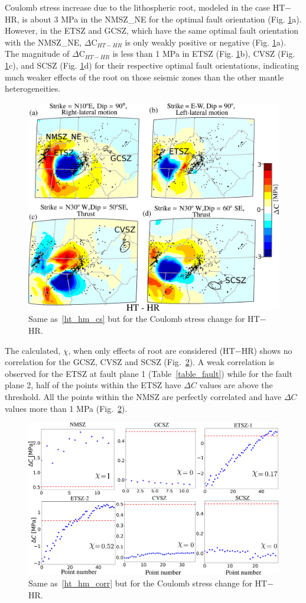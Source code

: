 \documentclass[draft,linenumbers]{agujournal2018}
\begin{document}
Coulomb stress increase due to the lithospheric root, modeled in the case HT$-$HR, is about 3 MPa in the NMSZ\_NE for the optimal fault orientation (Fig. \ref{ht_hr_cs}a). However, in the ETSZ and GCSZ, which have the same optimal fault orientation with the NMSZ\_NE, $\Delta $C$_{HT-HR}$ is only weakly positive or negative (Fig. \ref{ht_hr_cs}a). The magnitude of $\Delta $C$_{HT-HR}$ is less than 1 MPa in ETSZ (Fig. \ref{ht_hr_cs}b), CVSZ (Fig. \ref{ht_hr_cs}c), and SCSZ (Fig. \ref{ht_hr_cs}d) for their respective optimal fault orientations, indicating much weaker effects of the root on those seismic zones than the other mantle heterogeneities. 
%
\begin{figure}[h!]
    \centering
    \includegraphics[width=0.75\linewidth]{figures/cs_ht_hr.png}
    \caption{Same as~\ref{ht_hm_cs} but for the Coulomb stress change for HT$-$HR. }
    \label{ht_hr_cs}
\end{figure}

The calculated, $\chi$, when only effects of root are considered (HT$-$HR) shows no correlation for the GCSZ, CVSZ and SCSZ (Fig.~\ref{ht_hr_corr}). A weak correlation is observed for the ETSZ at fault plane 1 (Table~\ref{table_fault}) while for the fault plane 2, half of the points within the ETSZ have $\Delta C$  values are above the threshold. All the points within the NMSZ are perfectly correlated and have $\Delta C$ values more than 1 MPa (Fig.~\ref{ht_hr_corr}).
%
\begin{figure}[h!]
    \centering
    \includegraphics[width=0.75\linewidth]{figures/corr_cs_ht_hr.png}
    \caption{Same as~\ref{ht_hm_corr} but for the Coulomb stress change for HT$-$HR.}
    \label{ht_hr_corr}
\end{figure}
\end{document}

